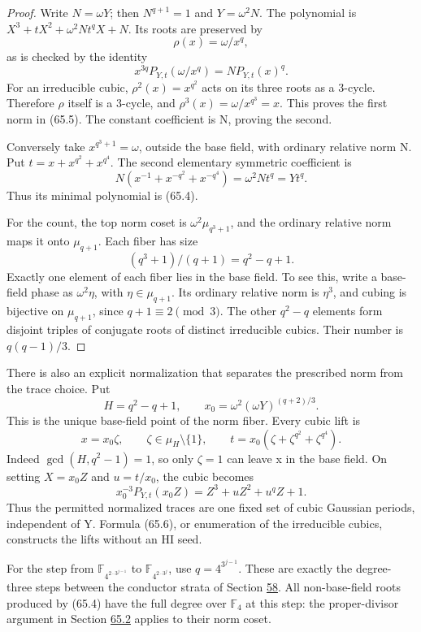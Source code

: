 \documentclass[11pt,reqno]{amsart}
\theoremstyle{plain}
\begin{document}
\begin{proof}
Write \(N=\omega Y\); then \(N^{q+1}=1\) and
\(Y=\omega^2N\). The polynomial is
\(X^3+tX^2+\omega^2Nt^qX+N\). Its roots are preserved by
\[
 \rho(x)=\omega/x^q,
\]
as is checked by the identity
\[
 x^{3q}P_{Y,t}(\omega/x^q)=N P_{Y,t}(x)^q.
\]
For an irreducible cubic, \(\rho^2(x)=x^{q^2}\) acts on its
three roots as a 3-cycle. Therefore \(\rho\) itself is a 3-cycle,
and \(\rho^3(x)=\omega/x^{q^3}=x\). This proves the first
norm in (65.5). The constant coefficient is N, proving the second.

Conversely take \(x^{q^3+1}=\omega\), outside the base field,
with ordinary relative norm N. Put \(t=x+x^{q^2}+x^{q^4}\).
The second elementary symmetric coefficient is
\[
 N(x^{-1}+x^{-q^2}+x^{-q^4})=\omega^2Nt^q=Yt^q.
\]
Thus its minimal polynomial is (65.4).

For the count, the top norm coset is
\(\omega^2\mu_{q^3+1}\), and the ordinary relative norm maps it
onto \(\mu_{q+1}\). Each fiber has size
\[
 (q^3+1)/(q+1)=q^2-q+1.
\]
Exactly one element of each fiber lies in the base field. To see this,
write a base-field phase as \(\omega^2\eta\), with
\(\eta\in\mu_{q+1}\). Its ordinary relative norm is
\(\eta^3\), and cubing is bijective on \(\mu_{q+1}\), since
\(q+1\equiv2\pmod3\). The other \(q^2-q\) elements form
disjoint triples of conjugate roots of distinct irreducible cubics.
Their number is \(q(q-1)/3\).
\end{proof}

There is also an explicit normalization that separates the prescribed
norm from the trace choice. Put
\[
 H=q^2-q+1,\qquad
 x_0=\omega^2(\omega Y)^{(q+2)/3}.
\]
This is the unique base-field point of the norm fiber. Every cubic
lift is
\begin{equation*}
 x=x_0\zeta,\qquad \zeta\in\mu_H\setminus\{1\},\qquad
 t=x_0(\zeta+\zeta^{q^2}+\zeta^{q^4}).
 \tag{65.6}
\end{equation*}
Indeed \(\gcd(H,q^2-1)=1\), so only \(\zeta=1\) can leave x
in the base field. On setting \(X=x_0Z\) and \(u=t/x_0\), the
cubic becomes
\begin{equation*}
 x_0^{-3}P_{Y,t}(x_0Z)=Z^3+uZ^2+u^qZ+1.
 \tag{65.7}
\end{equation*}
Thus the permitted normalized traces are one fixed set of cubic
Gaussian periods, independent of Y. Formula (65.6), or enumeration
of the irreducible cubics, constructs the lifts without an HI seed.

For the step from \(\mathbb F_{4^{2\cdot3^{j-1}}}\) to
\(\mathbb F_{4^{2\cdot3^j}}\), use \(q=4^{3^{j-1}}\).
These are exactly the degree-three steps between the conductor
strata of Section \hyperref[sec:58]{58}. All non-base-field roots produced by (65.4)
have the full degree over \(\mathbb F_4\) at this step: the
proper-divisor argument in Section \hyperref[sec:65.2]{65.2} applies to their norm coset.
\end{document}
